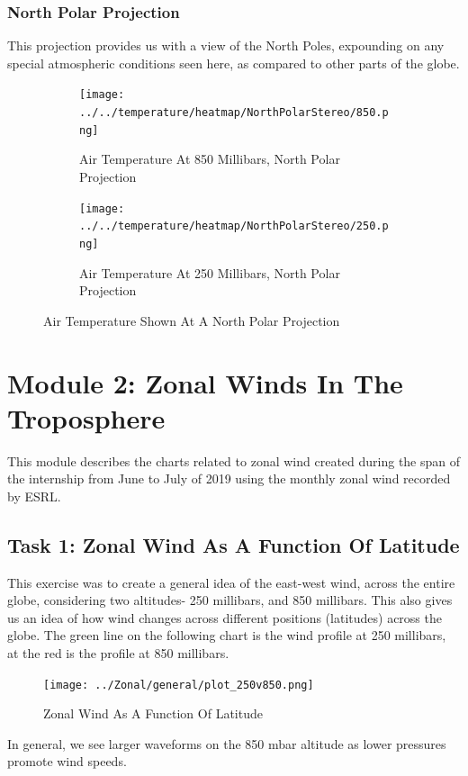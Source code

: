 \documentclass[hidelinks]{article}
\begin{document}
\subsubsection{North Polar Projection}
This projection provides us with a view of the North Poles, expounding on any special atmospheric conditions seen here, as compared to other parts of the globe.
\begin{figure}[h!]
	\begin{subfigure}[b]{\linewidth}
		\centering
		\texttt{[image: ../../temperature/heatmap/NorthPolarStereo/850.png]}
		\caption{Air Temperature At 850 Millibars, North Polar Projection}
	\end{subfigure}
	\begin{subfigure}[b]{\linewidth}
		\centering
		\texttt{[image: ../../temperature/heatmap/NorthPolarStereo/250.png]}
		\caption{Air Temperature At 250 Millibars, North Polar Projection}
	\end{subfigure}
	\caption{Air Temperature Shown At A North Polar Projection}
\end{figure}
\newpage
\section{Module 2: Zonal Winds In The Troposphere}
This module describes the charts related to zonal wind created during the span of the internship from June to July of 2019 using the monthly zonal wind recorded by ESRL.	
\subsection{Task 1: Zonal Wind As A Function Of Latitude}

This exercise was to create a general idea of the east-west wind, across the entire globe, considering two altitudes- 250 millibars, and 850 millibars. This also gives us an idea of how wind changes across different positions (latitudes) across the globe. The green line on the following chart is the wind profile at 250 millibars, at the red is the profile at 850 millibars.
\begin{figure}[h!] 
	\centering
	\texttt{[image: ../Zonal/general/plot\_250v850.png]}
	\caption{Zonal Wind As A Function Of Latitude}
\end{figure}

\noindent In general, we see larger waveforms on the 850 mbar altitude as lower pressures promote wind speeds.\\\\
\end{document}
